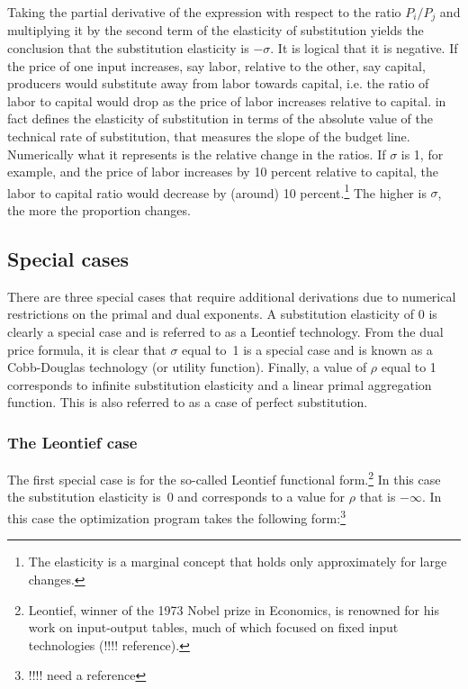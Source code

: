 Taking the partial derivative of the expression with respect to the ratio $P_i/P_j$ and
multiplying it by the second term of the elasticity of substitution yields the conclusion that the
substitution elasticity is $-\sigma$. It is logical that it is negative. If the price of one input
increases, say labor, relative to the other, say capital, producers would substitute away from labor
towards capital, i.e. the ratio of labor to capital would drop as the price of labor increases
relative to capital. \cite{Varian1992} in fact defines the elasticity of substitution in terms of
the absolute value of the technical rate of substitution, that measures the slope of the budget
line. Numerically what it represents is the relative change in the ratios. If $\sigma$ is 1,
for example, and the price of labor increases by 10 percent relative to capital, the labor to
capital ratio would decrease by (around) 10 percent.\footnote{The elasticity is a marginal concept
that holds only approximately for large changes.} The higher is $\sigma$, the more the
proportion changes.

\subsection{Special cases}

There are three special cases that require additional derivations due to numerical restrictions
on the primal and dual exponents. A substitution elasticity of 0 is clearly a special case and
is referred to as a Leontief technology. From the dual price formula, it is clear that $\sigma$
equal to~1 is a special case and is known as a Cobb-Douglas technology (or utility function).
Finally, a value of $\rho$ equal to 1 corresponds to infinite substitution elasticity and a
linear primal aggregation function. This is also referred to as a case of perfect substitution.

\subsubsection{The Leontief case}

The first special case is for the so-called Leontief functional form.\footnote{Leontief, winner of
the 1973 Nobel prize in Economics, is renowned for his work on input-output tables, much of which
focused on fixed input technologies (!!!! reference).}  In this case the substitution elasticity
is~0 and corresponds to a value for $\rho$ that is ${-\infty}$. In this case the optimization
program takes the following form:\footnote{!!!! need a reference}

